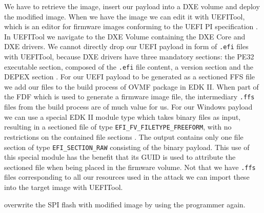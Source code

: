 We have to retrieve the image, insert our payload into a \ac{DXE} volume and deploy the modified image.
When we have the image we can edit it with UEFITool, which is an editor for firmware images conforming to the \ac{UEFI} \ac{PI} specification \cite{uefitool}.
In UEFITool we navigate to the \ac{DXE} Volume containing the \ac{DXE} Core and \ac{DXE} drivers.
We cannot directly drop our \ac{UEFI} payload in form of \lstinline{.efi} files with UEFITool, because \ac{DXE} drivers have three mandatory sections: the \ac{PE32} executable section, composed of the \lstinline{.efi} file content, a version section and the \ac{DEPEX} section \cite[Vol 3, 2.1.4.1.4]{pi-spec}.
For our \ac{UEFI} payload to be generated as a sectioned \ac{FFS} file we add our files to the build process of \ac{OVMF} package in \ac{EDK} II. When part of the \ac{FDF} which is used to generate a firmware image file, the intermediary \lstinline{.ffs} files from the build process are of much value for us.
For our Windows payload we can use a special \ac{EDK} II module type which takes binary files as input, resulting in a sectioned file of type \lstinline{EFI_FV_FILETYPE_FREEFORM}, with no restrictions on the contained file sections \cite[Vol 3, 2.1.4.1.7]{pi-spec}.
The output contains only one file section of type \lstinline{EFI_SECTION_RAW} consisting of the binary payload.
This use of this special module has the benefit that its \ac{GUID} is used to attribute the sectioned file when being placed in the firmware volume.
Not that we have \lstinline{.ffs} files corresponding to all our resources used in the attack we can import these into the target image with UEFITool.

overwrite the SPI flash with modified image by using the programmer again.